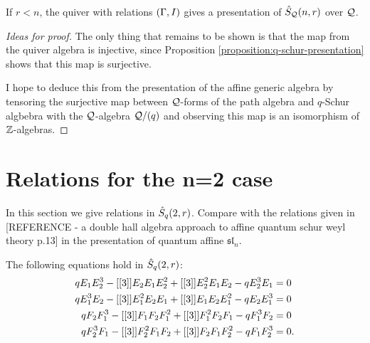 \documentclass[a4paper, 11pt]{report}
\begin{document}
\begin{conjecture}
If $r<n$, the quiver with relations $(\Gamma,\qrelations)$ gives a presentation of $\Qqschur$ over $\qfrac$.
\end{conjecture}

\begin{proof}[Ideas for proof]
The only thing that remains to be shown is that the map from the quiver algebra is injective, since Proposition \ref{proposition:q-schur-presentation} shows that this map is surjective.

I hope to deduce this from the presentation of the affine generic algebra by tensoring the surjective map between $\qfrac$-forms of the path algebra and $q$-Schur algbebra with the $\qfrac$-algebra $\qfrac/{(q)}$ and observing this map is an isomorphism of $\integers$-algebras.
\end{proof}


\section{Relations for the n=2 case}

In this section we give relations in $\qschur[2,r]$. Compare with the relations given in {\color{red}[REFERENCE - a double hall algebra approach to affine quantum schur weyl theory p.13]} in the presentation of quantum affine $\mathfrak{sl}_n$.

\begin{lemma}\label{lemma:period-2-q-relations}
The following equations hold in $\qschur[2,r]$:
\begin{align*}
qE_1 E_2^3 -\qint{3}E_2 E_1 E_2^2 +\qint{3}E_2^2 E_1 E_2 -qE_2^3 E_1 &= 0\\
qE_1^3 E_2 -\qint{3}E_1^2 E_2 E_1 +\qint{3}E_1 E_2 E_1^2 -qE_2 E_1^3 &= 0\\
qF_2 F_1^3 -\qint{3}F_1 F_2 F_1^2 +\qint{3}F_1^2 F_2 F_1 -qF_1^3 F_2 &= 0\\
qF_2^3 F_1 -\qint{3}F_2^2 F_1 F_2 +\qint{3}F_2 F_1 F_2^2 -qF_1 F_2^3 &= 0.
\end{align*}
\end{lemma}
\end{document}
